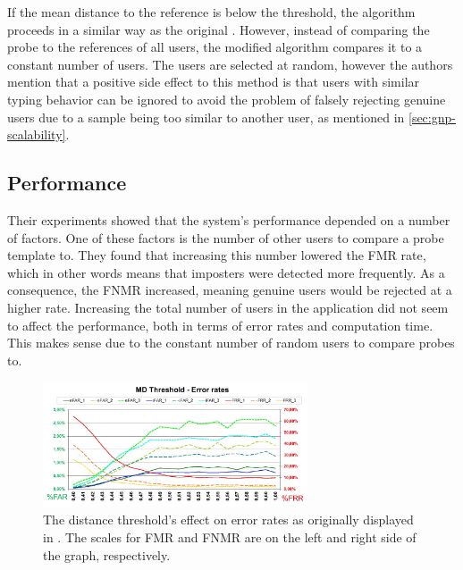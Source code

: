 \documentclass[informationsecurity]{gucmasterproject}
\begin{document}
If the mean distance to the reference is below the threshold, the algorithm proceeds in a similar way as the original \cite{gnp}.
However, instead of comparing the probe to the references of all users, the modified algorithm compares it to a constant number of users.
The users are selected at random, however the authors mention that a positive side effect to this method is that users with similar typing behavior can be ignored to avoid the problem of falsely rejecting genuine users due to a sample being too similar to another user, as mentioned in \autoref{sec:gnp-scalability}.


\subsection{Performance}
Their experiments showed that the system's performance depended on a number of factors.
One of these factors is the number of other users to compare a probe template to.
They found that increasing this number lowered the FMR rate, which in other words means that imposters were detected more frequently.
As a consequence, the FNMR increased, meaning genuine users would be rejected at a higher rate.
Increasing the total number of users in the application did not seem to affect the performance, both in terms of error rates and computation time.
This makes sense due to the constant number of random users to compare probes to.

\begin{figure}[h]
    \centering
    \includegraphics[width=0.7\textwidth]{messerman/messerman_thresh1}
    \caption{The distance threshold's effect on error rates as originally displayed in \cite{Messerman}. The scales for FMR and FNMR are on the left and right side of the graph, respectively.}
    \label{fig:messerman-threshold}
\end{figure}
\end{document}
